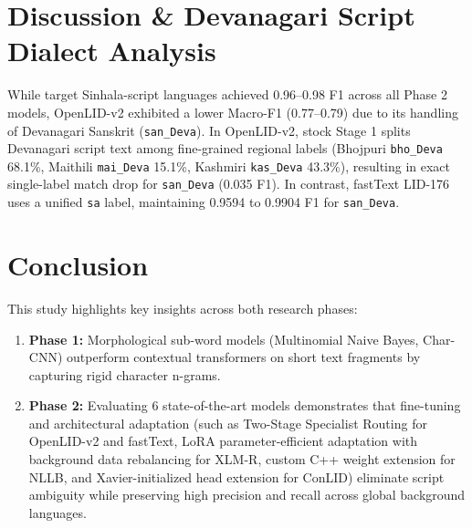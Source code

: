\documentclass[conference]{IEEEtran}
\begin{document}
\section{Discussion \& Devanagari Script Dialect Analysis}
While target Sinhala-script languages achieved 0.96--0.98 F1 across all Phase 2 models, OpenLID-v2 exhibited a lower Macro-F1 (0.77--0.79) due to its handling of Devanagari Sanskrit (\texttt{san\_Deva}). In OpenLID-v2, stock Stage 1 splits Devanagari script text among fine-grained regional labels (Bhojpuri \texttt{bho\_Deva} 68.1\%, Maithili \texttt{mai\_Deva} 15.1\%, Kashmiri \texttt{kas\_Deva} 43.3\%), resulting in exact single-label match drop for \texttt{san\_Deva} (0.035 F1). In contrast, fastText LID-176 uses a unified \texttt{sa} label, maintaining 0.9594 to 0.9904 F1 for \texttt{san\_Deva}.

\FloatBarrier
\section{Conclusion}
This study highlights key insights across both research phases:
\begin{enumerate}
    \item \textbf{Phase 1:} Morphological sub-word models (Multinomial Naive Bayes, Char-CNN) outperform contextual transformers on short text fragments by capturing rigid character n-grams.
    \item \textbf{Phase 2:} Evaluating 6 state-of-the-art models demonstrates that fine-tuning and architectural adaptation (such as Two-Stage Specialist Routing for OpenLID-v2 and fastText, LoRA parameter-efficient adaptation with background data rebalancing for XLM-R, custom C++ weight extension for NLLB, and Xavier-initialized head extension for ConLID) eliminate script ambiguity while preserving high precision and recall across global background languages.
\end{enumerate}
\end{document}
